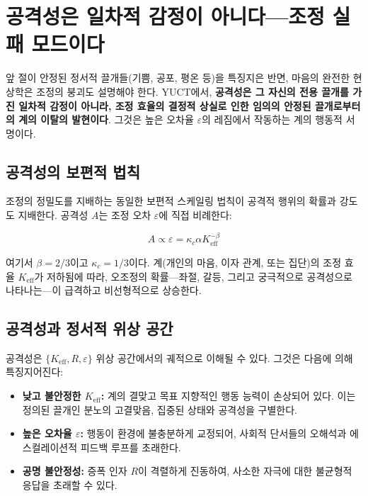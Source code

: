 \documentclass[12pt,a4paper]{article}
\begin{document}
	\section{공격성은 일차적 감정이 아니다—조정 실패 모드이다}
	
	앞 절이 안정된 정서적 끌개들(기쁨, 공포, 평온 등)을 특징지은 반면, 마음의 완전한 현상학은 조정의 붕괴도 설명해야 한다. YUCT에서, \textbf{공격성은 그 자신의 전용 끌개를 가진 일차적 감정이 아니라, 조정 효율의 결정적 상실로 인한 임의의 안정된 끌개로부터의 계의 이탈의 발현이다}. 그것은 높은 오차율 \(\varepsilon\)의 레짐에서 작동하는 계의 행동적 서명이다.
	
	\subsection{공격성의 보편적 법칙}
	
	조정의 정밀도를 지배하는 동일한 보편적 스케일링 법칙이 공격적 행위의 확률과 강도도 지배한다. 공격성 \(A\)는 조정 오차 \(\varepsilon\)에 직접 비례한다:
	
	\begin{equation}
		A \propto \varepsilon = \kappa_c \alpha K_{\mathrm{eff}}^{-\beta}
	\end{equation}
	
	여기서 \(\beta = 2/3\)이고 \(\kappa_c = 1/3\)이다. 계(개인의 마음, 이자 관계, 또는 집단)의 조정 효율 \(K_{\mathrm{eff}}\)가 저하됨에 따라, 오조정의 확률—좌절, 갈등, 그리고 궁극적으로 공격성으로 나타나는—이 급격하고 비선형적으로 상승한다.
	
	\subsection{공격성과 정서적 위상 공간}
	
	공격성은 \(\{K_{\mathrm{eff}}, R, \varepsilon\}\) 위상 공간에서의 궤적으로 이해될 수 있다. 그것은 다음에 의해 특징지어진다:
	
	\begin{itemize}
		\item \textbf{낮고 불안정한 \(K_{\mathrm{eff}}\):} 계의 결맞고 목표 지향적인 행동 능력이 손상되어 있다. 이는 정의된 끌개인 분노의 고결맞음, 집중된 상태와 공격성을 구별한다.
		\item \textbf{높은 오차율 \(\varepsilon\):} 행동이 환경에 불충분하게 교정되어, 사회적 단서들의 오해석과 에스컬레이션적 피드백 루프를 초래한다.
		\item \textbf{공명 불안정성:} 증폭 인자 \(R\)이 격렬하게 진동하여, 사소한 자극에 대한 불균형적 응답을 초래할 수 있다.
	\end{itemize}
	
\end{document}
